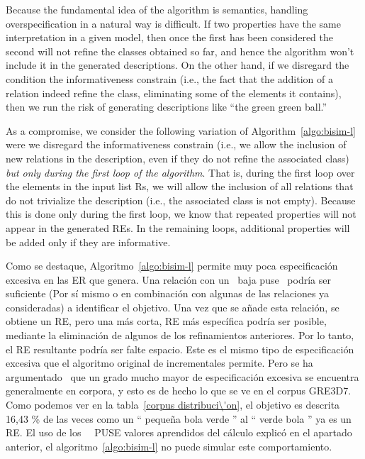 Because the fundamental idea of the algorithm is semantics, handling overspecification in 
a natural way is difficult. If two properties have the same interpretation in a given 
model, then once the first has been considered the second will not refine the classes 
obtained so far, and hence the algorithm won't include it in the generated descriptions. 
On the other hand, if we disregard the condition the informativeness constrain (i.e., 
the fact that the addition of a relation indeed refine the class, eliminating some of 
the elements it contains), then we run the risk of generating descriptions like ``the green 
green ball.''

As a compromise, we consider the following variation of Algorithm~\ref{algo:bisim-l} were 
we disregard the informativeness constrain (i.e., we allow the inclusion of new relations 
in the description, even if they do not refine the associated class) \emph{but only during the 
first loop of the algorithm}.  That is, during the first loop over the elements in the 
input list Rs, we will allow the inclusion of all relations that do not trivialize the 
description (i.e., the associated class is not empty).  Because this is done only during 
the first loop, we know that repeated properties will not appear in the generated REs.  
In the remaining loops, additional properties will be added only if they are informative. 

Como se destaque, Algoritmo~\ref{algo:bisim-l} permite muy poca especificaci\'on excesiva en las ER que
genera. Una relaci\'on con un \ baja puse \ podr\'{i}a ser suficiente
(Por s\'{i} mismo o en combinaci\'on con algunas de las relaciones ya consideradas) a
identificar el objetivo. Una vez que se a\~nade esta relaci\'on, se obtiene un RE, pero una m\'as corta,
RE m\'as espec\'{i}fica podr\'{i}a ser posible, mediante la eliminaci\'on de algunos de los refinamientos anteriores.
Por lo tanto, el RE resultante podr\'{i}a ser falte espacio. Este es el mismo tipo de especificaci\'on excesiva
que el algoritmo original de incrementales permite. Pero se ha argumentado~\cite{Engelhardt_Bailey_Ferreira_2006, Arts_Maes_Noordman_Jansen_2011} que
un grado mucho mayor de especificaci\'on excesiva se encuentra generalmente en corpora, y esto
es de hecho lo que se ve en el corpus GRE3D7. Como podemos ver en la tabla~\ref{corpus distribuci\'on},
el objetivo es descrita 16,43 \% de las veces como un `` peque\~na bola verde '' al `` verde
bola '' ya es un RE. El uso de los \ \ PUSE valores aprendidos del c\'alculo explic\'o
en el apartado anterior, el algoritmo~\ref{algo:bisim-l} no puede simular este comportamiento.

